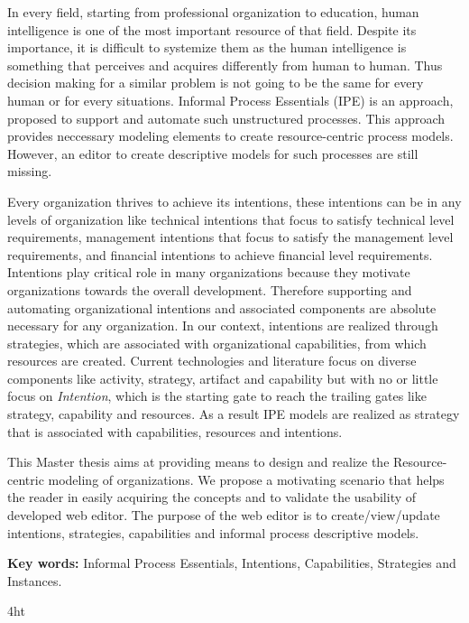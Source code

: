 \documentclass[
               fontsize=12pt, %
               paper=a4,
               twoside, %
               BCOR=3mm, %
               DIV=13,   %
               headinclude=true,
               footinclude=false,
               bibliography=totoc,
               headsepline,
               cleardoublepage=empty,
               parskip=half,
               pointlessnumbers, %
               final   %
               ]{scrbook}
\begin{document}
In every field, starting from professional organization to education, human intelligence is one of the most important resource of that field. Despite its importance, it is difficult to systemize them as the human intelligence is something that perceives and acquires differently from human to human. Thus decision making for a similar problem is not going to be the same for every human or for every situations. Informal Process Essentials (IPE) is an approach, proposed to support and automate such unstructured processes. This approach provides neccessary modeling elements to create resource-centric process models. However, an editor to create descriptive models for such processes are still missing. 

Every organization thrives to achieve its intentions, these intentions can be in any levels of  organization like technical intentions that focus to satisfy technical level requirements, management intentions that focus to satisfy the management level requirements, and financial intentions to achieve financial level requirements. Intentions play critical role in many organizations because they motivate organizations towards the overall development. Therefore supporting and automating organizational intentions and associated components are absolute necessary for any organization. In our context, intentions are realized through strategies, which are associated with organizational capabilities, from which resources are created. Current technologies and literature focus on diverse components  like activity, strategy, artifact and capability but with no or little focus on \textit{Intention}, which is the starting gate to reach the  trailing gates like strategy, capability and resources. As a result IPE models are realized as strategy that is associated with capabilities, resources and intentions.  

This Master thesis aims at providing means to design and realize the Resource-centric modeling of organizations. We propose a motivating scenario that helps the reader in easily acquiring the concepts and to validate the usability of developed web editor. The purpose of the web editor is to create/view/update intentions, strategies, capabilities and informal process descriptive models. 


\textbf{Key words:} Informal Process Essentials, Intentions, Capabilities, Strategies and Instances. 


\iftex4ht
\else
{}
\fi
\end{document}
